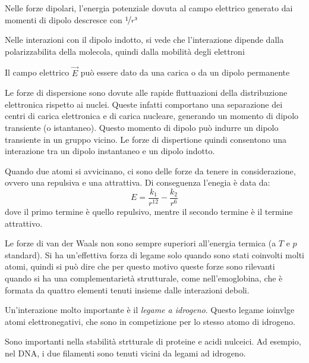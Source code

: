 Nelle forze dipolari, l'energia potenziale dovuta al campo elettrico generato dai momenti di dipolo descresce con $\nicefrac{1}{r^3}$

Nelle interazioni con il dipolo indotto, si vede che l'interazione dipende dalla polarizzabilita della molecola, quindi dalla mobilità degli elettroni

Il campo elettrico $\vec{E}$ può essere dato da una carica o da un dipolo permanente

Le forze di dispersione sono dovute alle rapide fluttuazioni della distribuzione elettronica rispetto ai nuclei. Queste infatti comportano una separazione dei centri di carica elettronica e di carica nucleare, generando un momento di dipolo transiente (o istantaneo). Questo momento di dipolo può indurre un dipolo transiente in un gruppo vicino. Le forze di dispertione quindi consentono una interazione tra un dipolo instantaneo e un dipolo indotto.

Quando due atomi si avvicinano, ci sono delle forze da tenere in considerazione, ovvero una repulsiva e una attrattiva. Di conseguenza l'enegia è data da:
\[
  E = \frac{k_1}{r^{12}}-\frac{k_2}{r^6}
\]
dove il primo termine è quello repulsivo, mentre il secondo termine è il termine attrattivo.


Le forze di van der Waals non sono sempre superiori all'energia termica (a $T$ e $p$ standard). Si ha un'effettiva forza di legame solo quando sono stati coinvolti molti atomi, quindi si può dire che per questo motivo queste forze sono rilevanti quando si ha una complementarietà strutturale, come nell'emoglobina, che è formata da quattro elementi tenuti insieme dalle interazioni deboli.

Un'interazione molto importante è il \emph{legame a idrogeno}. Questo legame ioinvlge atomi elettronegativi, che sono in competizione per lo stesso atomo di idrogeno.

Sono importanti nella stabilità strtturale di proteine e acidi nulceici. Ad esempio, nel DNA, i due filamenti sono tenuti vicini da legami ad idrogeno.

